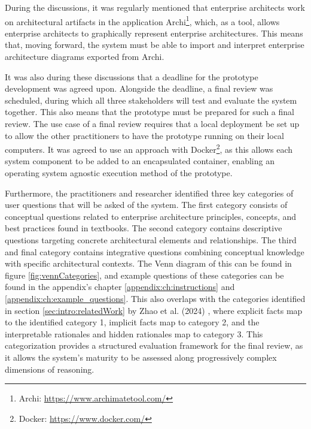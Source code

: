 During the discussions, it was regularly mentioned that enterprise architects work on architectural artifacts in the application Archi\footnote{Archi: \url{https://www.archimatetool.com/}}, which, as a tool, allows enterprise architects to graphically represent enterprise architectures. This means that, moving forward, the system must be able to import and interpret enterprise architecture diagrams exported from Archi.

It was also during these discussions that a deadline for the prototype development was agreed upon. Alongside the deadline, a final review was scheduled, during which all three stakeholders will test and evaluate the system together. This also means that the prototype must be prepared for such a final review. The use case of a final review requires that a local deployment be set up to allow the other practitioners to have the prototype running on their local computers. It was agreed to use an approach with Docker\footnote{Docker: \url{https://www.docker.com/}}, as this allows each system component to be added to an encapsulated container, enabling an operating system agnostic execution method of the prototype.

Furthermore, the practitioners and researcher identified three key categories of user questions that will be asked of the system. The first category consists of conceptual questions related to enterprise architecture principles, concepts, and best practices found in textbooks. The second category contains descriptive questions targeting concrete architectural elements and relationships. The third and final category contains integrative questions combining conceptual knowledge with specific architectural contexts. The Venn diagram of this can be found in figure \ref{fig:vennCategories}, and example questions of these categories can be found in the appendix's chapter \ref{appendix:ch:instructions} and \ref{appendix:ch:example_questions}. This also overlaps with the categories identified in section \ref{sec:intro:relatedWork} by Zhao et al. (2024) \cite{zhao2024retrieval}, where explicit facts map to the identified category 1, implicit facts map to category 2, and the interpretable rationales and hidden rationales map to category 3. This categorization provides a structured evaluation framework for the final review, as it allows the system's maturity to be assessed along progressively complex dimensions of reasoning.


